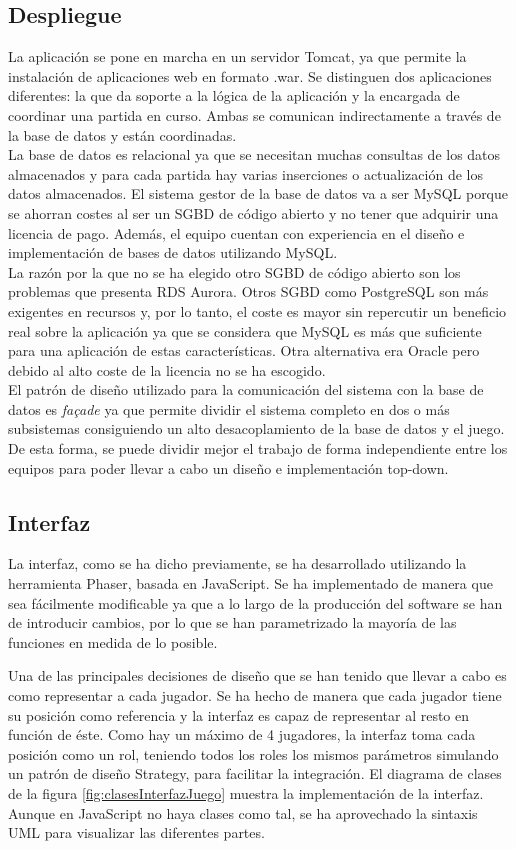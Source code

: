 \subsection{Despliegue}
La aplicación se pone en marcha en un servidor Tomcat, ya que permite la instalación de aplicaciones web en formato .war. Se distinguen dos aplicaciones diferentes: la que da soporte a la lógica de la aplicación y la encargada de coordinar una partida en curso. Ambas se comunican indirectamente a través de la base de datos y están coordinadas. \\
La base de datos es relacional ya que se necesitan muchas consultas de los datos almacenados y para cada partida hay varias inserciones o actualización de los datos almacenados. El sistema gestor de la base de datos va a ser MySQL porque se ahorran costes al ser un SGBD de código abierto y no tener que adquirir una licencia de pago. Además, el equipo cuentan con experiencia en el diseño e implementación de bases de datos utilizando MySQL. \\
La razón por la que no se ha elegido otro SGBD de código abierto son los problemas que presenta RDS Aurora. Otros SGBD como PostgreSQL son más exigentes en recursos y, por lo tanto, el coste es mayor sin repercutir un beneficio real sobre la aplicación ya que se considera que MySQL es más que suficiente para una aplicación de estas características.
Otra alternativa era Oracle pero debido al alto coste de la licencia no se ha escogido. \\
El patrón de diseño utilizado para la comunicación del sistema con la base de datos es \textit{façade} ya que permite dividir el sistema completo en dos o más subsistemas consiguiendo un alto desacoplamiento de la base de datos y el juego. De esta forma, se puede dividir mejor el trabajo de forma independiente entre los equipos para poder llevar a cabo un diseño e implementación top-down.

\subsection{Interfaz}
La interfaz, como se ha dicho previamente, se ha desarrollado utilizando la herramienta Phaser, basada en JavaScript. Se ha implementado de manera que sea fácilmente modificable ya que a lo largo de la producción del software se han de introducir cambios, por lo que se han parametrizado la mayoría de las funciones en medida de lo posible.

Una de las principales decisiones de diseño que se han tenido que llevar a cabo es como representar a cada jugador. Se ha hecho de manera que cada jugador tiene su posición como referencia y la interfaz es capaz de representar al resto en función de éste. Como hay un máximo de 4 jugadores, la interfaz toma cada posición como un rol,  teniendo todos los roles los mismos parámetros simulando un patrón de diseño Strategy, para facilitar la integración. El diagrama de clases de la figura \ref{fig:clasesInterfazJuego} muestra la implementación de la interfaz. Aunque en JavaScript no haya clases como tal, se ha aprovechado la sintaxis UML para visualizar las diferentes partes.

